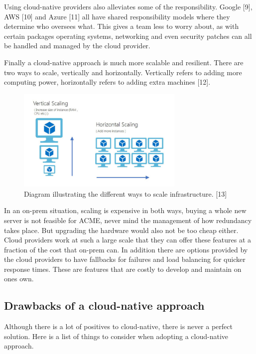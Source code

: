   Using cloud-native providers also alleviates some of the responsibility. Google [9], AWS [10] and Azure [11] all have shared responsibility models where 
  they determine who oversees what. This gives a team less to worry about, as with certain packages operating systems, networking and even 
  security patches can all be handled and managed by the cloud provider.

  Finally a cloud-native approach is much more scalable and resilient. There are two ways to scale, vertically and horizontally.
  Vertically refers to adding more computing power, horizontally refers to adding extra machines [12].

  \begin{figure}[H]
    \centering
    \includegraphics[width=8cm]{assets/scalingOptions.jpg}
    \caption{Diagram illustrating the different ways to scale infrastructure. [13]}
    \label{fig:scalingOptions}
  \end{figure}

  In an on-prem situation, scaling is expensive in both ways, buying a whole new server is not feasible for ACME, never mind the management of how
  redundancy takes place. But upgrading the hardware would also not be too cheap either. Cloud providers work at such a large scale that they can offer
  these features at a fraction of the cost that on-prem can. In addition there are options provided by the cloud providers to have fallbacks for failures and 
  load balancing for quicker response times. These are features that are costly to develop and maintain on ones own. 

  \subsection{Drawbacks of a cloud-native approach}
  Although there is a lot of positives to cloud-native, there is never a perfect solution. Here is a list of things to consider when adopting a cloud-native
  approach.

